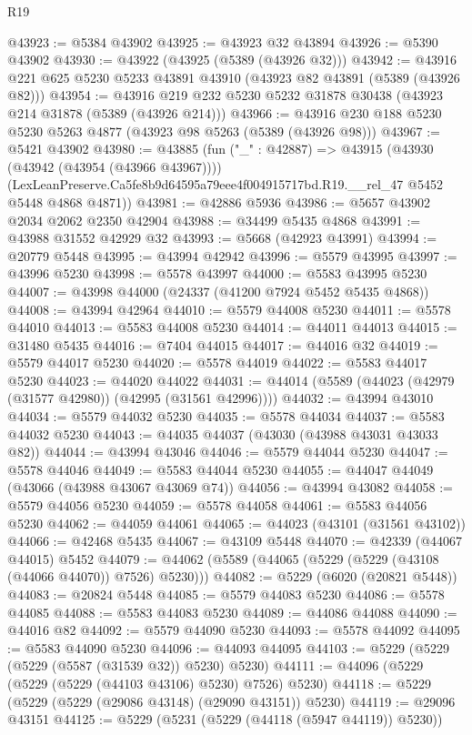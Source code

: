 \begin{lexlean}{R19}
\begin{coremodule}
@43923 := @5384 @43902
@43925 := @43923 @32 @43894
@43926 := @5390 @43902
@43930 := @43922 (@43925 (@5389 (@43926 @32)))
@43942 := @43916 @221 @625 @5230 @5233 @43891 @43910 (@43923 @82 @43891 (@5389 (@43926 @82)))
@43954 := @43916 @219 @232 @5230 @5232 @31878 @30438 (@43923 @214 @31878 (@5389 (@43926 @214)))
@43966 := @43916 @230 @188 @5230 @5230 @5263 @4877 (@43923 @98 @5263 (@5389 (@43926 @98)))
@43967 := @5421 @43902
@43980 := @43885
    (fun ("_" : @42887) =>
    @43915
      (@43930 (@43942 (@43954 (@43966 @43967))))
      (LexLeanPreserve.Ca5fe8b9d64595a79eee4f004915717bd.R19.__rel_47 @5452 @5448 @4868 @4871))
@43981 := @42886 @5936
@43986 := @5657 @43902 @2034 @2062 @2350 @42904
@43988 := @34499 @5435 @4868
@43991 := @43988 @31552 @42929 @32
@43993 := @5668 (@42923 @43991)
@43994 := @20779 @5448
@43995 := @43994 @42942
@43996 := @5579 @43995
@43997 := @43996 @5230
@43998 := @5578 @43997
@44000 := @5583 @43995 @5230
@44007 := @43998 @44000 (@24337 (@41200 @7924 @5452 @5435 @4868))
@44008 := @43994 @42964
@44010 := @5579 @44008 @5230
@44011 := @5578 @44010
@44013 := @5583 @44008 @5230
@44014 := @44011 @44013
@44015 := @31480 @5435
@44016 := @7404 @44015
@44017 := @44016 @32
@44019 := @5579 @44017 @5230
@44020 := @5578 @44019
@44022 := @5583 @44017 @5230
@44023 := @44020 @44022
@44031 := @44014 (@5589 (@44023 (@42979 (@31577 @42980)) (@42995 (@31561 @42996))))
@44032 := @43994 @43010
@44034 := @5579 @44032 @5230
@44035 := @5578 @44034
@44037 := @5583 @44032 @5230
@44043 := @44035 @44037 (@43030 (@43988 @43031 @43033 @82))
@44044 := @43994 @43046
@44046 := @5579 @44044 @5230
@44047 := @5578 @44046
@44049 := @5583 @44044 @5230
@44055 := @44047 @44049 (@43066 (@43988 @43067 @43069 @74))
@44056 := @43994 @43082
@44058 := @5579 @44056 @5230
@44059 := @5578 @44058
@44061 := @5583 @44056 @5230
@44062 := @44059 @44061
@44065 := @44023 (@43101 (@31561 @43102))
@44066 := @42468 @5435
@44067 := @43109 @5448
@44070 := @42339 (@44067 @44015) @5452
@44079 := @44062 (@5589 (@44065 (@5229 (@5229 (@43108 (@44066 @44070)) @7526) @5230)))
@44082 := @5229 (@6020 (@20821 @5448))
@44083 := @20824 @5448
@44085 := @5579 @44083 @5230
@44086 := @5578 @44085
@44088 := @5583 @44083 @5230
@44089 := @44086 @44088
@44090 := @44016 @82
@44092 := @5579 @44090 @5230
@44093 := @5578 @44092
@44095 := @5583 @44090 @5230
@44096 := @44093 @44095
@44103 := @5229 (@5229 (@5229 (@5587 (@31539 @32)) @5230) @5230)
@44111 := @44096 (@5229 (@5229 (@5229 (@44103 @43106) @5230) @7526) @5230)
@44118 := @5229 (@5229 (@5229 (@29086 @43148) (@29090 @43151)) @5230)
@44119 := @29096 @43151
@44125 := @5229 (@5231 (@5229 (@44118 (@5947 @44119)) @5230))

\end{coremodule}
\end{lexlean}
